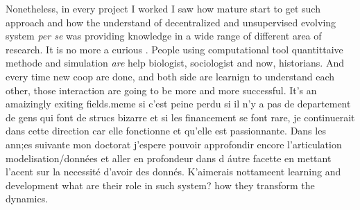 \documentclass[10pt]{paper}
\begin{document}
Nonetheless, in every project I worked I saw how mature start to get such approach and how the understand of decentralized and unsupervised evolving system \emph{per se} was providing knowledge in a wide range of different area of research. It is no more a curious . People using computational tool quantittaive methode and simulation \emph{are} help biologist, sociologist and now, historians. And every time new coop are done, and both side are learnign to understand each other, those interaction are going  to be more and more successful. It's an amaizingly exiting fields.meme si c'est peine perdu si il n'y a pas de departement de gens qui font de strucs bizarre et si les financement se font rare, je continuerait dans cette direction car elle fonctionne et qu'elle est passionnante.  Dans les ann;es suivante mon doctorat j'espere pouvoir approfondir encore l'articulation modelisation/données  et aller en profondeur dans d áutre facette en mettant l'acent sur la necessité d'avoir des donnés.  K'aimerais nottameent learning and development what are their role in such system? how they transform the dynamics.
\end{document}
